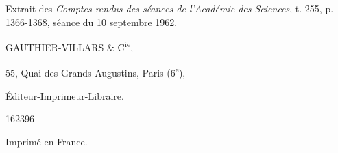 Extrait des \textit{Comptes rendus des séances de l'Académie des Sciences},
t. 255, p. 1366-1368, séance du 10 septembre 1962.

GAUTHIER-VILLARS \& C\textsuperscript{ie},

55, Quai des Grands-Augustins, Paris (6\textsuperscript{e}),

Éditeur-Imprimeur-Libraire.

162396

Imprimé en France.
